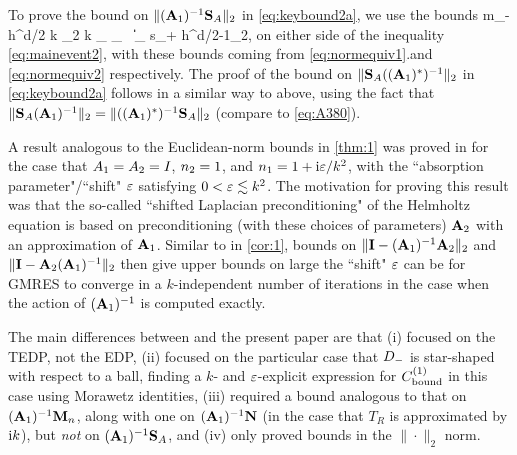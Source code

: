 To prove the bound on  $\|(\mathbf{A}_{1})^{-1}\mathbf{S}_A\|_{2}$ in \cref{eq:keybound2a}, we use the bounds 
\beqs
m_- h^{d/2} k \N{\tbu}_2 \leq k _{\LtDR} \leq {}_{\HokDR}
\,\tand\,
\big\|\nabla {}\big\|_{\LtDR} \leq s_+ h^{d/2-1}\N{\bff}_2,
\eeqs
on either side of the inequality \cref{eq:mainevent2}, with these bounds coming from \cref{eq:normequiv1}.and \cref{eq:normequiv2} respectively. The proof of the bound on 
$\|\mathbf{S}_A((\mathbf{A}_{1})^*)^{-1}\|_{2}$ in \cref{eq:keybound2a} follows in a similar way to above, using the fact that 
$\|\mathbf{S}_A (\mathbf{A}_{1})^{-1}\|_2=\|((\mathbf{A}_{1})^*)^{-1}\mathbf{S}_A\|_2$ (compare to \cref{eq:A380}).
\epf

A result analogous to the Euclidean-norm bounds in \cref{thm:1} was proved in \cite{GaGrSp:15} for the case that $A_{1}= A_{2}= I$, $n_{2}= 1$, and $n_{1} = 1 + \mathrm{i}\varepsilon/k^2$, with the ``absorption parameter"/``shift" $\varepsilon$ satisfying $0<\varepsilon\lesssim k^2$. The motivation for proving this result was that the so-called ``shifted Laplacian preconditioning" of the Helmholtz equation is based on preconditioning (with these choices of parameters) $\mathbf{A}_{2}$ with an approximation of $\mathbf{A}_{1}$. Similar to in \cref{cor:1}, bounds on $\|\mathbf{I} -  (\mathbf{A}_{1})^{-1}\mathbf{A}_{2} \|_2$ and 
$\|\mathbf{I} - \mathbf{A}_{2}  (\mathbf{A}_{1})^{-1}\|_2$
 then give upper bounds on large the ``shift" $\varepsilon$ can be for GMRES to converge in a $k$-independent number of iterations in the case when the action of $(\mathbf{A}_{1})^{-1}$ is computed exactly.

The main differences between \cite{GaGrSp:15} and the present paper are that (i)  \cite{GaGrSp:15} focused on the TEDP, not the EDP,
(ii) \cite{GaGrSp:15} focused on the particular case that $D_{-}$ is star-shaped with respect to a ball, finding a $k$- and $\varepsilon$-explicit expression for $C^{(1)}_{\rm bound}$ in this case using Morawetz identities,
(iii) \cite{GaGrSp:15} required a bound analogous to that on 
$(\mathbf{A}_{1})^{-1}\mathbf{M}_{n}$, along with one on $(\mathbf{A}_{1})^{-1}\mathbf{N}$ (in the case that $T_R$ is approximated by $\mathrm{i} k$), but \emph{not} on 
$(\mathbf{A}_{1})^{-1}\mathbf{S}_{A}$, and (iv) \cite{GaGrSp:15} only proved bounds in the $\|\cdot\|_2$ norm.
\ere

